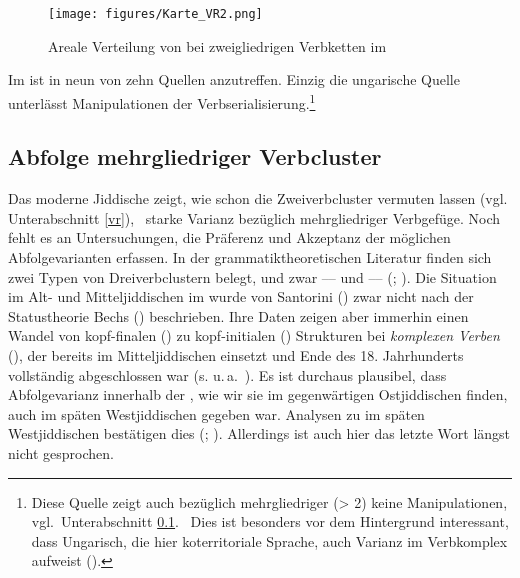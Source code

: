  
\begin{figure}
\centering
\texttt{[image: figures/Karte\_VR2.png]}
		\caption{\label{KarteVR} Areale Verteilung von \hai{{\VR}} bei zweigliedrigen Verbketten im }
	\end{figure}



    
    
    Im  ist in neun von zehn Quellen \hai{{\VR}} anzutreffen. Einzig die ungarische Quelle  unterlässt Manipulationen der Verbserialisierung.\footnote{Diese Quelle zeigt auch bezüglich mehrgliedriger (> 2)  keine Manipulationen, vgl.\, Unterabschnitt \ref{verbcluster}. \,%
    Dies ist besonders vor dem Hintergrund interessant, dass Ungarisch, die hier koterritoriale Sprache, auch Varianz im Verbkomplex aufweist (\citealt{Bartos2004}).} 

\subsection{Abfolge mehrgliedriger Verbcluster}\label{verbcluster}%
 Das moderne Jiddische zeigt, wie schon die Zweiverbcluster vermuten lassen (vgl.\, Unterabschnitt \ref{vr}), \,%
 starke Varianz bezüglich mehrgliedriger Verbgefüge. Noch fehlt es an Untersuchungen, die Präferenz und Akzeptanz der möglichen Abfolgevarianten erfassen. In der grammatiktheoretischen Literatur finden sich zwei Typen von Dreiverbclustern belegt, und zwar –– und ––  (\citealt[117]{BestenWalraven1986}; \citealt[70–79]{Vikner2001}). Die Situation im Alt- und Mitteljiddischen im  wurde von Santorini (\citeyear{Santorini1995, Santorini1994, Santorini1993b, Santorini1993a, Santorini1992, Santorini1989}) zwar nicht nach der Statustheorie Bechs (\citeyear{Bech1955,Bech1957}) beschrieben. Ihre Daten zeigen aber immerhin einen Wandel von kopf-finalen (\hai{{\OV}}) zu kopf-initialen (\hai{{\VO}}) Strukturen bei \textit{komplexen Verben} (), der bereits im Mitteljiddischen einsetzt und Ende des 18. Jahrhunderts vollständig abgeschlossen war (s. u.\,a.\, \citealt[270]{Santorini1993a}). 
Es ist durchaus plausibel, dass Abfolgevarianz innerhalb der , wie wir sie im gegenwärtigen Ostjiddischen finden, auch im späten Westjiddischen gegeben war. Analysen zu \hai{{\VR}} im späten Westjiddischen bestätigen dies (\citealt[36–38]{Schaefer2008}; \citealt[61f]{Schaefer2010}). Allerdings ist auch hier das letzte Wort längst nicht gesprochen. 


